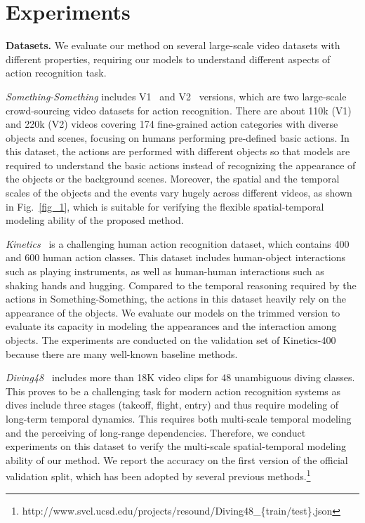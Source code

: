 
\section{Experiments}

\noindent \textbf{Datasets.}
We evaluate our method on several large-scale video datasets with different properties, requiring our models to understand different aspects of action recognition task.

{\textit{Something-Something}} includes V1~\cite{goyal2017something} and V2~\cite{mahdisoltani2018fine} versions, which are two large-scale crowd-sourcing video datasets for action recognition.
There are about 110k (V1) and 220k (V2) videos covering 174 fine-grained action categories with diverse objects and scenes,
focusing on humans performing pre-defined basic actions.
In this dataset, the actions are performed with different objects so that models are required to understand the basic actions instead of recognizing the appearance of the objects or the background scenes.
Moreover, the spatial and the temporal scales of the objects and the events vary hugely across different videos, as shown in Fig.~\ref{fig_1},
which is suitable for verifying the flexible spatial-temporal modeling ability of the proposed method.





{\textit{Kinetics}}~\cite{carreira2017quo} is a challenging human action recognition dataset, which contains 400 and 600 human action classes.
This dataset includes human-object interactions such as playing instruments, as well as human-human interactions such as shaking hands and hugging.
Compared to the temporal reasoning required by the actions in Something-Something, the actions in this dataset heavily rely on the appearance of the objects.
We evaluate our models on the trimmed version to evaluate its capacity in modeling the appearances and the interaction among objects.
The experiments are conducted on the validation set of Kinetics-400~\cite{carreira2017quo} because there are many well-known baseline methods.



{\textit{Diving48}}~\cite{li2018resound} includes more than 18K video clips for 48 unambiguous diving classes.
This proves to be a challenging task for modern action recognition systems as dives include three stages (takeoff, flight, entry) and thus require modeling of long-term temporal dynamics.
This requires both multi-scale temporal modeling and the perceiving of long-range dependencies.
Therefore, we conduct experiments on this dataset to verify the multi-scale spatial-temporal modeling ability of our method.
We report the accuracy on the first version of the official validation split, which has been adopted by several previous methods.\footnote{http://www.svcl.ucsd.edu/projects/resound/Diving48\_\{train/test\}.json}



